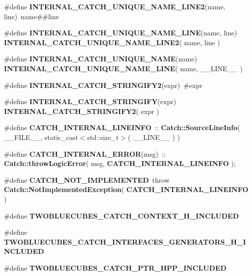 \begin{DoxyCompactItemize}
\item 
\#define \textbf{ I\+N\+T\+E\+R\+N\+A\+L\+\_\+\+C\+A\+T\+C\+H\+\_\+\+U\+N\+I\+Q\+U\+E\+\_\+\+N\+A\+M\+E\+\_\+\+L\+I\+N\+E2}(name,  line)~name\#\#line
\item 
\#define \textbf{ I\+N\+T\+E\+R\+N\+A\+L\+\_\+\+C\+A\+T\+C\+H\+\_\+\+U\+N\+I\+Q\+U\+E\+\_\+\+N\+A\+M\+E\+\_\+\+L\+I\+NE}(name,  line)~\textbf{ I\+N\+T\+E\+R\+N\+A\+L\+\_\+\+C\+A\+T\+C\+H\+\_\+\+U\+N\+I\+Q\+U\+E\+\_\+\+N\+A\+M\+E\+\_\+\+L\+I\+N\+E2}( name, line )
\item 
\#define \textbf{ I\+N\+T\+E\+R\+N\+A\+L\+\_\+\+C\+A\+T\+C\+H\+\_\+\+U\+N\+I\+Q\+U\+E\+\_\+\+N\+A\+ME}(name)~\textbf{ I\+N\+T\+E\+R\+N\+A\+L\+\_\+\+C\+A\+T\+C\+H\+\_\+\+U\+N\+I\+Q\+U\+E\+\_\+\+N\+A\+M\+E\+\_\+\+L\+I\+NE}( name, \+\_\+\+\_\+\+L\+I\+N\+E\+\_\+\+\_\+ )
\item 
\#define \textbf{ I\+N\+T\+E\+R\+N\+A\+L\+\_\+\+C\+A\+T\+C\+H\+\_\+\+S\+T\+R\+I\+N\+G\+I\+F\+Y2}(expr)~\#expr
\item 
\#define \textbf{ I\+N\+T\+E\+R\+N\+A\+L\+\_\+\+C\+A\+T\+C\+H\+\_\+\+S\+T\+R\+I\+N\+G\+I\+FY}(expr)~\textbf{ I\+N\+T\+E\+R\+N\+A\+L\+\_\+\+C\+A\+T\+C\+H\+\_\+\+S\+T\+R\+I\+N\+G\+I\+F\+Y2}( expr )
\item 
\#define \textbf{ C\+A\+T\+C\+H\+\_\+\+I\+N\+T\+E\+R\+N\+A\+L\+\_\+\+L\+I\+N\+E\+I\+N\+FO}~\+::\textbf{ Catch\+::\+Source\+Line\+Info}( \+\_\+\+\_\+\+F\+I\+L\+E\+\_\+\+\_\+, static\+\_\+cast$<$std\+::size\+\_\+t$>$( \+\_\+\+\_\+\+L\+I\+N\+E\+\_\+\+\_\+ ) )
\item 
\#define \textbf{ C\+A\+T\+C\+H\+\_\+\+I\+N\+T\+E\+R\+N\+A\+L\+\_\+\+E\+R\+R\+OR}(msg)~\+::\textbf{ Catch\+::throw\+Logic\+Error}( msg, \textbf{ C\+A\+T\+C\+H\+\_\+\+I\+N\+T\+E\+R\+N\+A\+L\+\_\+\+L\+I\+N\+E\+I\+N\+FO} );
\item 
\#define \textbf{ C\+A\+T\+C\+H\+\_\+\+N\+O\+T\+\_\+\+I\+M\+P\+L\+E\+M\+E\+N\+T\+ED}~throw \textbf{ Catch\+::\+Not\+Implemented\+Exception}( \textbf{ C\+A\+T\+C\+H\+\_\+\+I\+N\+T\+E\+R\+N\+A\+L\+\_\+\+L\+I\+N\+E\+I\+N\+FO} )
\item 
\#define \textbf{ T\+W\+O\+B\+L\+U\+E\+C\+U\+B\+E\+S\+\_\+\+C\+A\+T\+C\+H\+\_\+\+C\+O\+N\+T\+E\+X\+T\+\_\+\+H\+\_\+\+I\+N\+C\+L\+U\+D\+ED}
\item 
\#define \textbf{ T\+W\+O\+B\+L\+U\+E\+C\+U\+B\+E\+S\+\_\+\+C\+A\+T\+C\+H\+\_\+\+I\+N\+T\+E\+R\+F\+A\+C\+E\+S\+\_\+\+G\+E\+N\+E\+R\+A\+T\+O\+R\+S\+\_\+\+H\+\_\+\+I\+N\+C\+L\+U\+D\+ED}
\item 
\#define \textbf{ T\+W\+O\+B\+L\+U\+E\+C\+U\+B\+E\+S\+\_\+\+C\+A\+T\+C\+H\+\_\+\+P\+T\+R\+\_\+\+H\+P\+P\+\_\+\+I\+N\+C\+L\+U\+D\+ED}

\end{DoxyCompactItemize}

